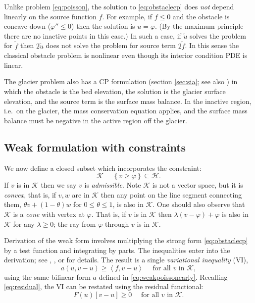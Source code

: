 \documentclass[letterpaper,final,12pt,reqno]{amsart}
\theoremstyle{claim}
\newcommand{\ip}[2]{\left<#1,#2\right>}
\numberwithin{equation}{section}
\numberwithin{figure}{section}
\numberwithin{table}{section}
\numberwithin{theorem}{section}
\begin{document}
Unlike problem \eqref{eq:poisson}, the solution to \eqref{eq:obstaclecp} does \emph{not} depend linearly on the source function $f$.  For example, if $f \le 0$ and the obstacle is concave-down ($\varphi'' \le 0$) then the solution is $u=\varphi$.  (By the maximum principle \cite{Evans2010} there are no inactive points in this case.)  In such a case, if $\tilde u$ solves the problem for $\tilde f$ then $2\tilde u$ does not solve the problem for source term $2\tilde f$.  In this sense the classical obstacle problem is nonlinear even though its interior condition PDE is linear.

The glacier problem also has a CP formulation (section \ref{sec:sia}; see also \cite{Calvoetal2002}) in which the obstacle is the bed elevation, the solution is the glacier surface elevation, and the source term is the surface mass balance.  In the inactive region, i.e.~on the glacier, the mass conservation equation applies, and the surface mass balance must be negative in the active region off the glacier.

\subsection*{Weak formulation with constraints}  We now define a closed subset which incorporates the constraint:
\begin{equation}
\mathcal{K} = \left\{v \ge \varphi\right\} \subseteq \mathcal{H}.  \label{eq:Kdefine}
\end{equation}
If $v$ is in $\mathcal{K}$ then we say $v$ is \emph{admissible}.  Note $\mathcal{K}$ is not a vector space, but it is \emph{convex}, that is, if $v,w$ are in $\mathcal{K}$ then any point on the line segment connecting them, $\theta v + (1-\theta) w$ for $0 \le \theta \le 1$, is also in $\mathcal{K}$.  One should also observe that $\mathcal{K}$ is a \emph{cone} with vertex at $\varphi$.  That is, if $v$ is in $\mathcal{K}$ then $\lambda(v-\varphi) + \varphi$ is also in $\mathcal{K}$ for any $\lambda \ge 0$; the ray from $\varphi$ through $v$ is in $\mathcal{K}$.

Derivation of the weak form involves multiplying the strong form \eqref{eq:obstaclecp} by a test function and integrating by parts.  The inequalities enter into the derivation; see \cite[Chapter 12]{Bueler2021}, \cite{JouvetBueler2012}, or \cite{KinderlehrerStampacchia1980} for details.  The result is a single \emph{variational inequality} (VI),
\begin{equation}
  a(u,v-u) \ge \ip{f}{v-u} \quad \text{ for all } v \text{ in } \mathcal{K}, \label{eq:obstaclevi}
\end{equation}
using the same bilinear form $a$ defined in \eqref{eq:weakpoissonearly}.  Recalling \eqref{eq:residual}, the VI can be restated using the residual functional:
\begin{equation}
  F(u)[v-u] \ge 0 \quad \text{ for all } v \text{ in } \mathcal{K}. \label{eq:obstacleviresidual}
\end{equation}
\end{document}
